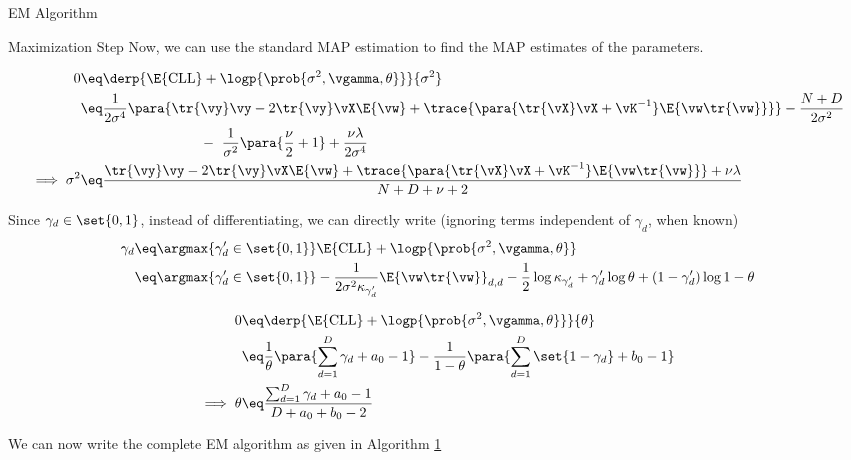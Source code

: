 \documentclass{article}
\newcommand{\ecll}{\E{\text{CLL}}}
\begin{document}
\begin{question}
\begin{qsection}{EM Algorithm}
\begin{qsubsection}{Maximization Step}
			Now, we can use the standard MAP estimation to find the MAP estimates of the parameters.
			\begin{enumerate}[label=\bt{\theenumi.}]
					\begin{align*}
						0					&\eq	\derp{\ecll + \logp{\prob{\sigma^2, \vgamma, \theta}}}{\sigma^2} \\
						&\eq	\frac{1}{2 \sigma^4} \para{\tr{\vy} \vy - 2 \tr{\vy} \vX \E{\vw} + \trace{\para{\tr{\vX} \vX + \vK^{-1}} \E{\vw \tr{\vw}}}} - \frac{N + D}{2 \sigma^2} \\
						&\hspace{3cm} - \ \frac{1}{\sigma^2} \para{\frac{\nu}{2} + 1} + \frac{\nu \lambda}{2 \sigma^4} \\
						\implies \sigma^2	&\eq	\frac{\tr{\vy} \vy - 2 \tr{\vy} \vX \E{\vw} + \trace{\para{\tr{\vX} \vX + \vK^{-1}} \E{\vw \tr{\vw}}} + \nu \lambda}{N + D + \nu + 2}
					\end{align*}


					Since $\gamma_d \in \set{0, 1}$, instead of differentiating, we can directly write (ignoring terms independent of $\gamma_d$, when known)
					\begin{align*}
						\gamma_d	&\eq	\argmax{\gamma'_d \in \set{0, 1}} \ecll + \logp{\prob{\sigma^2, \vgamma, \theta}} \\
						&\eq	\argmax{\gamma'_d \in \set{0, 1}} - \frac{1}{2 \sigma^2 \kappa_{\gamma'_d}} \E{\vw \tr{\vw}}_{d, d} - \frac{1}{2} \log{\kappa_{\gamma'_d}} + \gamma'_d \log{\theta} + (1 - \gamma'_d) \log{1 - \theta}
					\end{align*}

					\begin{align*}
						0							&\eq	\derp{\ecll + \logp{\prob{\sigma^2, \vgamma, \theta}}}{\theta} \\
						&\eq	\frac{1}{\theta} \para{\sum_{d = 1}^D \gamma_d + a_0 - 1} - \frac{1}{1 - \theta} \para{\sum_{d = 1}^D \set{1 - \gamma_d} + b_0 - 1} \\
						\implies \theta				&\eq	\frac{\sum_{d = 1}^D \gamma_d + a_0 - 1}{D + a_0 + b_0 - 2}
					\end{align*}
			\end{enumerate}

			We can now write the complete EM algorithm as given in Algorithm \hyperlink{algo:1}{1}

		\end{qsubsection}


\end{qsection}
\end{question}
\end{document}
